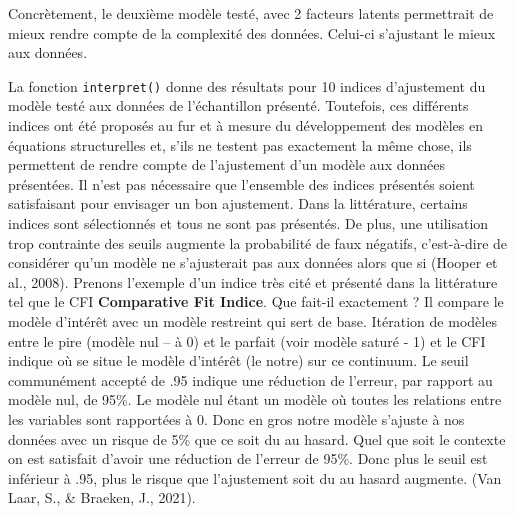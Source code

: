 \documentclass[
  french,
  11pt,
  a4paper,
]{article}
\begin{document}
Concrètement, le deuxième modèle testé, avec 2 facteurs latents
permettrait de mieux rendre compte de la complexité des données.
Celui-ci s'ajustant le mieux aux données.

\begin{tcolorbox}[enhanced jigsaw, arc=.35mm, bottomrule=.15mm, bottomtitle=1mm, breakable, colback=white, colbacktitle=quarto-callout-note-color!10!white, colframe=quarto-callout-note-color-frame, coltitle=black, left=2mm, leftrule=.75mm, opacityback=0, opacitybacktitle=0.6, rightrule=.15mm, title=\textcolor{quarto-callout-note-color}{\faInfo}\hspace{0.5em}{Note}, titlerule=0mm, toprule=.15mm, toptitle=1mm]

La fonction \texttt{interpret()} donne des résultats pour 10 indices
d'ajustement du modèle testé aux données de l'échantillon présenté.
Toutefois, ces différents indices ont été proposés au fur et à mesure du
développement des modèles en équations structurelles et, s'ils ne
testent pas exactement la même chose, ils permettent de rendre compte de
l'ajustement d'un modèle aux données présentées. Il n'est pas nécessaire
que l'ensemble des indices présentés soient satisfaisant pour envisager
un bon ajustement. Dans la littérature, certains indices sont
sélectionnés et tous ne sont pas présentés. De plus, une utilisation
trop contrainte des seuils augmente la probabilité de faux négatifs,
c'est-à-dire de considérer qu'un modèle ne s'ajusterait pas aux données
alors que si (Hooper et al., 2008). Prenons l'exemple d'un indice très
cité et présenté dans la littérature tel que le CFI \textbf{Comparative
Fit Indice}. Que fait-il exactement ? Il compare le modèle d'intérêt
avec un modèle restreint qui sert de base. Itération de modèles entre le
pire (modèle nul -- à 0) et le parfait (voir modèle saturé - 1) et le
CFI indique où se situe le modèle d'intérêt (le notre) sur ce continuum.
Le seuil communément accepté de .95 indique une réduction de l'erreur,
par rapport au modèle nul, de 95\%. Le modèle nul étant un modèle où
toutes les relations entre les variables sont rapportées à 0. Donc en
gros notre modèle s'ajuste à nos données avec un risque de 5\% que ce
soit du au hasard. Quel que soit le contexte on est satisfait d'avoir
une réduction de l'erreur de 95\%. Donc plus le seuil est inférieur à
.95, plus le risque que l'ajustement soit du au hasard augmente. (Van
Laar, S., \& Braeken, J., 2021).

\end{tcolorbox}
\end{document}
